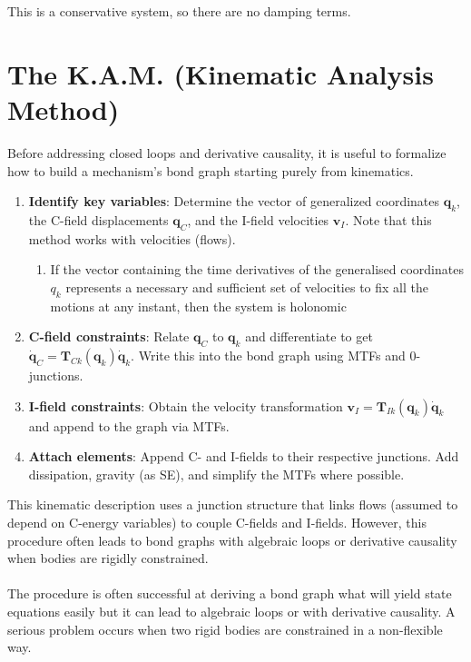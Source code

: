 This is a conservative system, so there are no damping terms. 


\section{The K.A.M. (Kinematic Analysis Method)}

Before addressing closed loops and derivative causality, it is useful to formalize how to build a mechanism's bond graph starting purely from kinematics.
\begin{enumerate}[leftmargin=2em,itemsep=2pt]
  \item \textbf{Identify key variables}: Determine the vector of generalized coordinates $\mathbf{q}_k$, the C-field displacements $\mathbf{q}_C$, and the I-field velocities $\mathbf{v}_I$. Note that this method works with velocities (flows).
  \begin{enumerate}
    \item If the vector containing the time derivatives of the generalised coordinates  $q_k$ represents a necessary and sufficient set of velocities to fix all the motions at any instant, then the system is holonomic
  \end{enumerate}
  \item \textbf{C-field constraints}: Relate $\mathbf{q}_C$ to $\mathbf{q}_k$ and differentiate to get $\dot{\mathbf{q}}_C = \mathbf{T}_{Ck}(\mathbf{q}_k)\dot{\mathbf{q}}_k$. Write this into the bond graph using MTFs and 0-junctions.
  \item \textbf{I-field constraints}: Obtain the velocity transformation $\mathbf{v}_I = \mathbf{T}_{Ik}(\mathbf{q}_k)\dot{\mathbf{q}}_k$ and append to the graph via MTFs.
  \item \textbf{Attach elements}: Append C- and I-fields to their respective junctions. Add dissipation, gravity (as SE), and simplify the MTFs where possible.
\end{enumerate}



This kinematic description uses a junction structure that links flows (assumed to depend on C-energy variables) to couple C-fields and I-fields. However, this procedure often leads to bond graphs with algebraic loops or derivative causality when bodies are rigidly constrained.


\paragraph{}
The procedure is often successful at deriving a bond graph what will yield state equations easily but it can lead to algebraic loops or with derivative causality. 
A serious problem occurs when two rigid bodies are constrained in a non-flexible way. 


